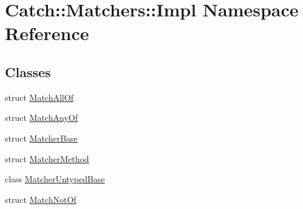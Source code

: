 \hypertarget{namespace_catch_1_1_matchers_1_1_impl}{}\section{Catch\+::Matchers\+::Impl Namespace Reference}
\label{namespace_catch_1_1_matchers_1_1_impl}
\subsection*{Classes}
\begin{DoxyCompactItemize}
\item 
struct \mbox{\hyperlink{struct_catch_1_1_matchers_1_1_impl_1_1_match_all_of}{Match\+All\+Of}}
\item 
struct \mbox{\hyperlink{struct_catch_1_1_matchers_1_1_impl_1_1_match_any_of}{Match\+Any\+Of}}
\item 
struct \mbox{\hyperlink{struct_catch_1_1_matchers_1_1_impl_1_1_matcher_base}{Matcher\+Base}}
\item 
struct \mbox{\hyperlink{struct_catch_1_1_matchers_1_1_impl_1_1_matcher_method}{Matcher\+Method}}
\item 
class \mbox{\hyperlink{class_catch_1_1_matchers_1_1_impl_1_1_matcher_untyped_base}{Matcher\+Untyped\+Base}}
\item 
struct \mbox{\hyperlink{struct_catch_1_1_matchers_1_1_impl_1_1_match_not_of}{Match\+Not\+Of}}
\end{DoxyCompactItemize}

